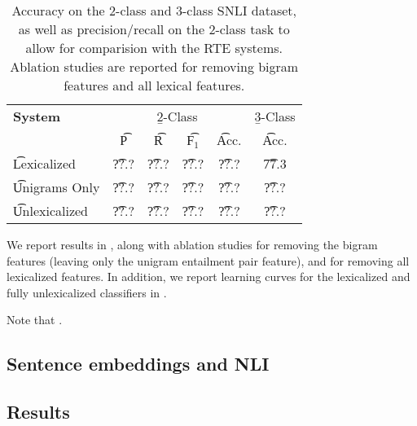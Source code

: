 \begin{table}
\begin{center}
\begin{tabular}{l@{\hskip \colspaceL}c@{\hskip \colspaceS}c@{\hskip \colspaceS}c@{\hskip \colspaceS}c@{\hskip \colspaceL}c}
\hline
\textbf{System} & \multicolumn{4}{c}{\b{2-Class}} & \b{3-Class} \\
 & \t{P} & \t{R} & \t{F$_1$} & \t{Acc.} & \t{Acc.} \\
\hline
\t{Lexicalized}            & \t{??.?} & \t{??.?} & \t{??.?} & \t{??.?} & \t{77.3} \\
\t{Unigrams Only}          & \t{??.?} & \t{??.?} & \t{??.?} & \t{??.?} & \t{??.?} \\
\t{Unlexicalized}          & \t{??.?} & \t{??.?} & \t{??.?} & \t{??.?} & \t{??.?} \\
\hline
\end{tabular}
\end{center}
\caption{
\label{tab:bowresults}
Accuracy on the 2-class and 3-class SNLI dataset, as well as precision/recall
  on the 2-class task to allow for comparision with the RTE systems.
Ablation studies are reported for removing bigram features and all lexical
  features.
}
\end{table}
%
%


We report results in , along with ablation studies for removing
  the bigram features (leaving only the unigram entailment pair feature),
  and for removing all lexicalized features.
In addition, we report learning curves for the lexicalized and fully unlexicalized
  classifiers in .

Note that .



\subsection{Sentence embeddings and NLI}

\subsection{Results}
